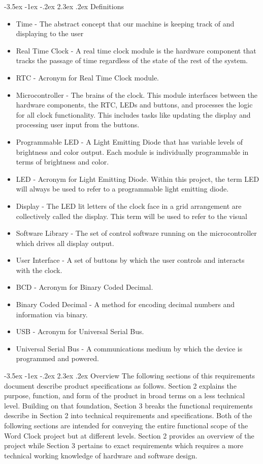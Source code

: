 \documentclass[10pt,draftclsnofoot,onecolumn]{IEEEtran}
\makeatletter
\renewcommand\section{\@startsection {section}{1}{\z@}%
                                   {-3.5ex \@plus -1ex \@minus -.2ex}%
                                   {2.3ex \@plus.2ex}%
                                   {\normalfont\LARGE\bfseries}}%
\makeatother
\begin{document}
\section{Definitions}
\begin{itemize}
  \item Time - The abstract concept that our machine is keeping track of and displaying to the user
  \item Real Time Clock - A real time clock module is the hardware component that tracks the passage
  of time regardless of the state of the rest of the system.
  \item RTC - Acronym for Real Time Clock module.
  \item Microcontroller - The brains of the clock. This module interfaces between the hardware
  components, the RTC, LEDs and buttons, and processes the logic for all clock functionality.
  This includes tasks like updating the display and processing user input from the buttons.
  \item Programmable LED - A Light Emitting Diode that has variable levels of brightness and
  color output. Each module is individually programmable in terms of brightness and color.
  \item LED - Acronym for Light Emitting Diode. Within this project, the term LED will always
  be used to refer to a programmable light emitting diode.
  \item Display - The LED lit letters of the clock face in a grid arrangement are collectively
  called the display. This term will be used to refer to the visual
  \item Software Library - The set of control software running on the microcontroller which drives all display output.
  \item User Interface - A set of buttons by which the user controls and interacts with the clock.
  \item BCD - Acronym for Binary Coded Decimal.
  \item Binary Coded Decimal - A method for encoding decimal numbers and information via binary.
  \item USB - Acronym for Universal Serial Bus.
  \item Universal Serial Bus - A communications medium by which the device is programmed and  powered.
\end{itemize}

\section{Overview}
The following sections of this requirements document describe product specifications as follows.
Section 2 explains the purpose, function, and form of the product in broad terms on a less
technical level. Building on that foundation, Section 3 breaks the functional requirements
describe in Section 2 into technical requirements and specifications.
	Both of the following sections are intended for conveying the entire functional
scope of the Word Clock project but at different levels. Section 2 provides an overview of the
project while Section 3 pertains to exact requirements which requires a more technical working
knowledge of hardware and software design.
\end{document}
